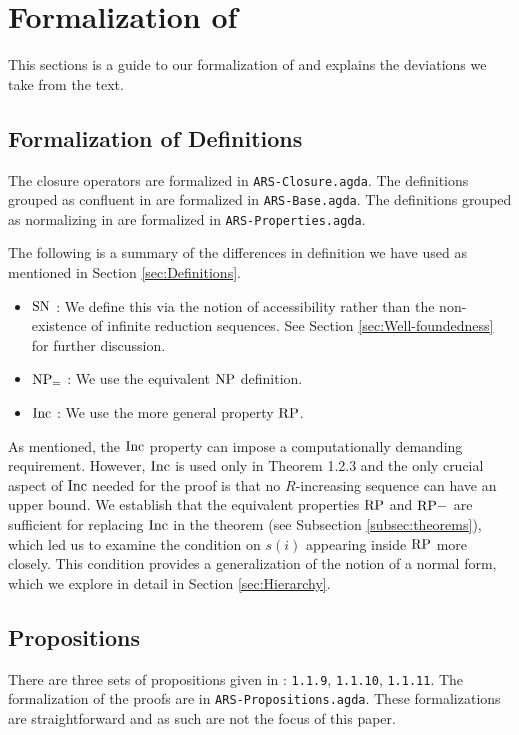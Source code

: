 \section{Formalization of \terese}
\label{sec:Formalization}
This sections is a guide to our formalization of \terese and explains the deviations we take from the text.  

\subsection{Formalization of Definitions}\label{subsec:def}
The closure operators are formalized in \texttt{ARS-Closure.agda}. 
The definitions grouped as confluent in \terese are formalized in \texttt{ARS-Base.agda}. 
The definitions grouped as normalizing in \terese are formalized in \texttt{ARS-Properties.agda}.  

The following is a summary of the differences in definition we have used as mentioned in Section \ref{sec:Definitions}. 
\begin{itemize}
    \item $\mathrm{SN}$ : We define this via the notion of accessibility rather than the non-existence of infinite reduction sequences. 
     See Section \ref{sec:Well-foundedness} for further discussion.
    \item $\mathrm{NP_=}$ : We use the equivalent $\mathrm{NP}$ definition. 
    \item $\mathrm{Inc}$ : We use the more general property $\mathrm{RP}$.      
\end{itemize}

As mentioned, the $\mathrm{Inc}$ property can impose a computationally demanding requirement. However, $\mathrm{Inc}$ is used only in Theorem 1.2.3 
and the only crucial aspect of $\mathrm{Inc}$ needed for the proof is that no $R$-increasing 
sequence can have an upper bound.
We establish that the equivalent properties $\mathrm{RP}$ and $\mathrm{RP{-}}$ are sufficient for replacing $\mathrm{Inc}$ in the theorem (see Subsection \ref{subsec:theorems}), 
which led us to examine the condition on $s (i)$ appearing inside $\mathrm{RP}$ more closely. This condition provides a generalization of the notion of a normal form, 
which we explore in detail in Section \ref{sec:Hierarchy}. 

\subsection{Propositions}
There are three sets of propositions given in \terese: \texttt{1.1.9}, \texttt{1.1.10}, \texttt{1.1.11}. 
The formalization of the proofs are in \texttt{ARS-Propositions.agda}. These formalizations are straightforward 
and as such are not the focus of this paper. 

